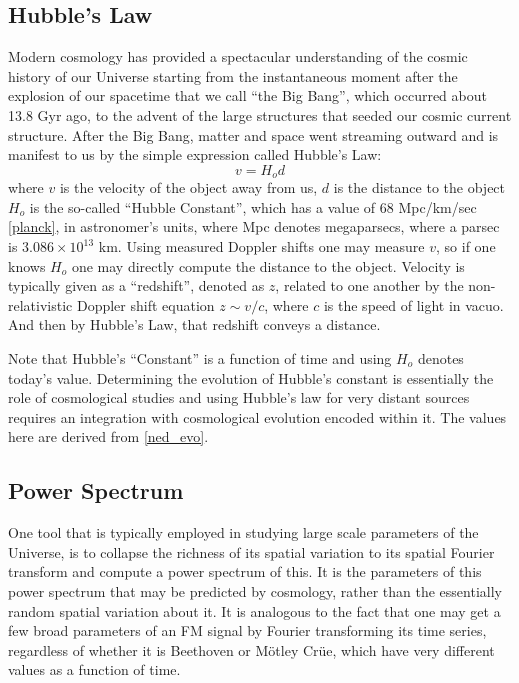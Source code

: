 \documentclass[ars]{/Users/daviddeboer1/Documents/Papers/Copernicus_LaTeX_Package_v_2_7/copernicus}
\begin{document}
\subsection{Hubble's Law}
\label{sec:hubble}
Modern cosmology has provided a spectacular understanding of the cosmic history of
our Universe starting from the instantaneous moment after the explosion of our
spacetime that we call ``the Big Bang'', which occurred about 13.8 Gyr ago, to the
advent of the large structures that seeded our cosmic current structure. After the
Big Bang, matter and space went streaming outward and is manifest to us by the simple
expression called Hubble's Law:
\begin{equation}
v = H_od
\end{equation}
where $v$ is the velocity of the object away from us, $d$ is the distance to the
object $H_o$ is the so-called ``Hubble Constant'', which has a value of 68 Mpc/km/sec
\ref{planck}, in astronomer's units, where Mpc denotes megaparsecs, where a parsec is
$3.086 \times 10^13$ km. Using measured Doppler shifts one may measure $v$, so if one
knows $H_o$ one may directly compute the distance to the object. Velocity is
typically given as a ``redshift'', denoted as $z$, related to one another by the
non-relativistic Doppler shift equation $z \sim v/c$, where $c$ is the speed of light
in vacuo. And then by Hubble's Law, that redshift conveys a distance.

Note that Hubble's ``Constant'' is a function of time and using $H_o$ denotes today's
value. Determining the evolution of Hubble's constant is essentially the role of
cosmological studies and using Hubble's law for very distant sources requires an
integration with cosmological evolution encoded within it. The values here are
derived from \ref{ned_evo}.

\subsection{Power Spectrum}
\label{sec:pspec}
One tool that is typically employed in studying large scale parameters of the
Universe, is to collapse the richness of its spatial variation to its spatial Fourier
transform and compute a power spectrum of this. It is the parameters of this power
spectrum that may be predicted by cosmology, rather than the essentially random
spatial variation about it. It is analogous to the fact that one may get a few broad
parameters of an FM signal by Fourier transforming its time series, regardless of whether it is
Beethoven or M\"{o}tley Cr\"{u}e, which have very different values as a function of time.
\end{document}
